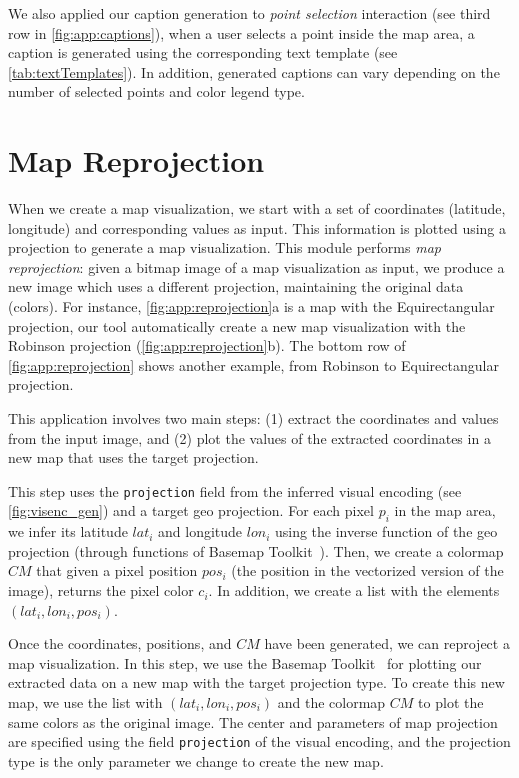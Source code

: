 We also applied our caption generation to \textit{point selection} interaction (see third row in \autoref{fig:app:captions}), \ie when a user selects a point inside the map area, a caption is generated using the corresponding text template (see \autoref{tab:textTemplates}). In addition, generated captions can vary depending on the number of selected points and color legend type.


\section{Map Reprojection}
\label{sec:app_reprojection}
When we create a map visualization, we start with a set of coordinates (latitude, longitude) and corresponding values as input. This information is plotted using a projection to generate a map visualization. 
This module performs \emph{map reprojection}: given a bitmap image of a map visualization as input, we produce a new image which uses a different projection, maintaining the original data (colors).
%
For instance, \autoref{fig:app:reprojection}a is a map with the Equirectangular projection, our tool automatically create a new map visualization with the Robinson projection (\autoref{fig:app:reprojection}b). The bottom row of \autoref{fig:app:reprojection} shows another example, from Robinson to Equirectangular projection.

\figAppReprojection

This application involves two main steps: (1) extract the coordinates and values from the input image, and (2) plot the values of the extracted coordinates in a new map that uses the target projection.

This step uses the \texttt{projection} field from the inferred visual encoding (see \autoref{fig:visenc_gen}) and a target geo projection. 
For each pixel $p_i$ in the map area, we infer its latitude $lat_i$ and longitude $lon_i$ using the inverse function of the geo projection (through functions of Basemap Toolkit~\citep{Whitaker2016}). 
Then, we create a colormap $CM$ that given a pixel position $pos_i$ (the position in the vectorized version of the image), returns the pixel color $c_i$.
In addition, we create a list with the elements $(lat_i, lon_i, pos_i)$.

Once the coordinates, positions, and $CM$ have been generated, we can reproject a map visualization. In this step, we use the Basemap Toolkit~\citep{Whitaker2016} for plotting our extracted data on a new map with the target projection type. To create this new map, we use the list with $(lat_i, lon_i, pos_i)$ and the colormap $CM$ to plot the same colors as the original image. The center and parameters of map projection are specified using the field \texttt{projection} of the visual encoding, and the projection type is the only parameter we change to create the new map.


